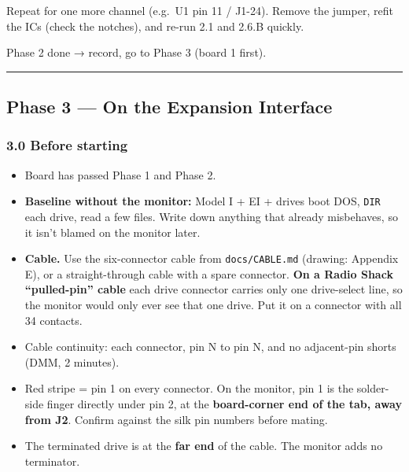 \documentclass[
  10pt,
  twoside]{article}
\providecommand{\tightlist}{%
  \setlength{\itemsep}{0pt}\setlength{\parskip}{0pt}}
\begin{document}
Repeat for one more channel (e.g.~U1 pin 11 / J1-24). Remove
the jumper, refit the ICs (check the notches), and re-run
2.1 and 2.6.B quickly.

Phase 2 done → record, go to Phase 3 (board 1 first).

\begin{center}\rule{0.5\linewidth}{0.5pt}\end{center}

\hypertarget{phase-3-on-the-expansion-interface}{%
\subsection{Phase 3 --- On the Expansion
Interface}\label{phase-3-on-the-expansion-interface}}

\hypertarget{before-starting}{%
\subsubsection{3.0 Before starting}\label{before-starting}}

\begin{itemize}
\tightlist
\item[$\square$]
  Board has passed Phase 1 and Phase 2.
\item[$\square$]
  \textbf{Baseline without the monitor:} Model I + EI +
  drives boot DOS, \texttt{DIR} each drive, read a few
  files. Write down anything that already misbehaves, so it
  isn't blamed on the monitor later.
\item[$\square$]
  \textbf{Cable.} Use the six-connector cable from
  \texttt{docs/CABLE.md} (drawing: Appendix E), or a
  straight-through cable with a spare connector. \textbf{On
  a Radio Shack ``pulled-pin'' cable} each drive connector
  carries only one drive-select line, so the monitor would
  only ever see that one drive. Put it on a connector with
  all 34 contacts.
\item[$\square$]
  Cable continuity: each connector, pin N to pin N, and no
  adjacent-pin shorts (DMM, 2 minutes).
\item[$\square$]
  Red stripe = pin 1 on every connector. On the monitor, pin
  1 is the solder-side finger directly under pin 2, at the
  \textbf{board-corner end of the tab, away from J2}.
  Confirm against the silk pin numbers before mating.
\item[$\square$]
  The terminated drive is at the \textbf{far end} of the
  cable. The monitor adds no terminator.
\end{itemize}
\end{document}
